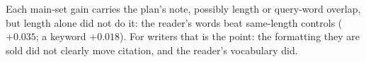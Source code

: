 \begin{takeaway}
Each main-set gain carries the plan's note, possibly length or query-word overlap, but length alone did not do it: the reader's words beat same-length controls ($+0.035$; a keyword $+0.018$).
For writers that is the point: the formatting they are sold did not clearly move citation, and the reader's vocabulary did.
\end{takeaway}
